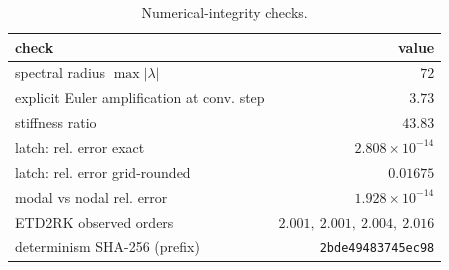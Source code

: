\begin{table}[t]
\centering
\caption{Numerical-integrity checks.}
\label{tab:exp8_numerics}
\footnotesize
\setlength{\tabcolsep}{4pt}
\begin{tabular}{lr}
\toprule
check & value \\
\midrule
spectral radius $\max|\lambda|$ & $72$ \\
explicit Euler amplification at conv. step & $3.73$ \\
stiffness ratio & $43.83$ \\
latch: rel. error exact & $2.808\times10^{-14}$ \\
latch: rel. error grid-rounded & $0.01675$ \\
modal vs nodal rel. error & $1.928\times10^{-14}$ \\
ETD2RK observed orders & $2.001,\ 2.001,\ 2.004,\ 2.016$ \\
determinism SHA-256 (prefix) & \texttt{2bde49483745ec98} \\
\bottomrule
\end{tabular}
\end{table}
